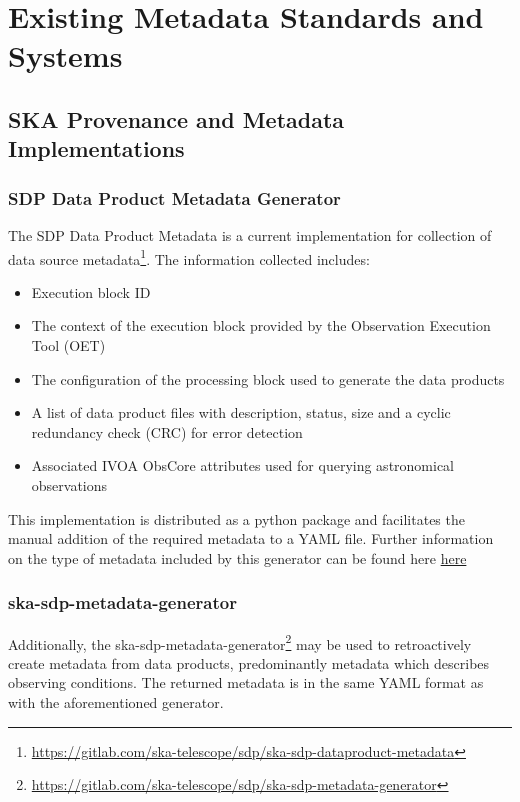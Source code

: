 \section{Existing Metadata Standards and Systems}\label{sec:exist_mod}

\subsection{SKA Provenance and Metadata Implementations}

\subsubsection{SDP Data Product Metadata Generator}

The SDP Data Product Metadata is a current implementation for collection of data source metadata\footnote{\url{https://gitlab.com/ska-telescope/sdp/ska-sdp-dataproduct-metadata}}.
The information collected includes:

\begin{itemize}
    \item Execution block ID
    \item The context of the execution block provided by the Observation Execution Tool (OET)
    \item The configuration of the processing block used to generate the data products
    \item A list of data product files with description, status, size and a cyclic redundancy check (CRC) for error detection
    \item Associated IVOA ObsCore attributes used for querying astronomical observations
\end{itemize}

This implementation is distributed as a python package and facilitates the manual addition of the required metadata to a YAML file. 
Further information on the type of metadata included by this generator can be found here \href{https://confluence.skatelescope.org/pages/viewpage.action?spaceKey=SWSI&title=ADR-55+Definition+of+metadata+for+data+management+at+AA0.5}{here}

\subsubsection{ska-sdp-metadata-generator}

Additionally, the ska-sdp-metadata-generator\footnote{\url{https://gitlab.com/ska-telescope/sdp/ska-sdp-metadata-generator}} may be used to retroactively create metadata from data products, predominantly metadata which describes observing conditions.
The returned metadata is in the same YAML format as with the aforementioned generator. 

